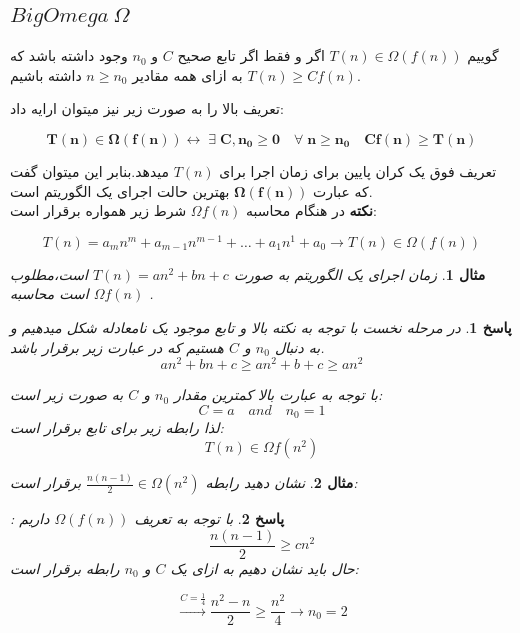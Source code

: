 \documentclass[12pt]{article}
\newtheorem{question}{مثال}[section]
\newtheorem{answer}{پاسخ}[section]
\begin{document}
\subsection{$Big Omega \ \Omega$}

گوییم  $T(n) \in \Omega(f(n))$ اگر و فقط اگر تابع صحیح $C$ و $n_0$ وجود داشته باشد که به ازای همه مقادیر $n \ge n_0$ داشته باشیم $T(n) \ge Cf(n)$.

تعریف بالا را به صورت زیر نیز میتوان ارايه داد:

\[
\mathbf{T(n)\in \Omega(f(n)) \leftrightarrow \; \exists \; C,n_0\ge0\quad \forall \; n\ge n_0 \quad Cf(n)\ge T(n)}
\]

تعریف فوق یک کران پایین برای زمان اجرا برای $T(n)$ میدهد.بنابر این میتوان گفت که عبارت $\mathbf{\Omega(f(n))}$ بهترین حالت اجرای یک الگوریتم است.\\ 
\newline
\textbf{نکته}
در هنگام محاسبه   $\Omega f(n)$ شرط زیر همواره برقرار است:

\[
T(n) = a_mn^m + a_{m-1}n^{m-1}+ \dots + a_1n^1+a_0
\rightarrow T(n) \in \Omega (f(n))
\]
\newline
\begin{question}
زمان اجرای یک الگوریتم به صورت $T(n) = an^2 + bn + c$
 است،مطلوب است محاسبه $\Omega f(n)$ .
\end{question}

\begin{answer}
در مرحله نخست با توجه به نکته بالا و تابع موجود یک نامعادله شکل میدهیم و به دنبال $n_0$ و $C$ هستیم که در عبارت زیر برقرار باشد.
\[
an^2 + bn + c \ge an^2 + b + c \ge an^2
\]

با توجه به عبارت بالا کمترین مقدار $n_0$ و $C$ به صورت زیر است:\\
\[
C = a \quad and \quad n_0 = 1
\]
لذا رابطه زیر برای تابع برقرار است:\\
\[
T(n) \in \Omega f(n^2)
\]

\end{answer}
\begin{question}
	نشان دهید رابطه $\frac{n(n-1)}{2} \in \Omega (n^2)$ برقرار است:
\end{question}

\begin{answer}
	با توجه به تعریف $\Omega(f(n))$ داریم :
\[
\frac{n(n-1)}{2} \ge cn^2
\]
	حال باید  نشان دهیم به ازای یک $C$ و $n_0$ رابطه برقرار است:
	
\[
\xrightarrow{C=\frac14} \frac{n^2 - n }{2}\ge \frac{n^2}{4}\rightarrow n_0 = 2
\]
\end{answer}
\end{document}
